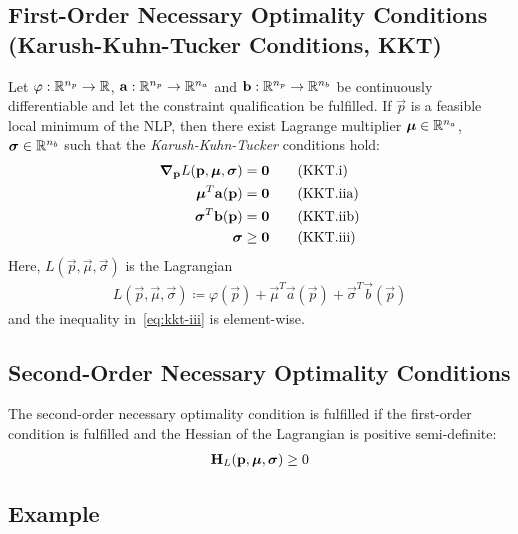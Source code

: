 		\subsection{First-Order Necessary Optimality Conditions (Karush-Kuhn-Tucker Conditions, KKT)}
			Let \( \varphi : \mathbb{R}^{n_p} \to \mathbb{R} \), \( \boldsymbol{\mathrm{a}} : \mathbb{R}^{n_p} \to \mathbb{R}^{n_a} \) and \( \boldsymbol{\mathrm{b}} : \mathbb{R}^{n_p} \to \mathbb{R}^{n_b} \) be continuously differentiable and let the constraint qualification be fulfilled. If \( \vec{p} \) is a feasible local minimum of the NLP, then there exist Lagrange multiplier \( \boldsymbol{\mathrm{\mu}} \in \mathbb{R}^{n_a} \), \( \boldsymbol{\mathrm{\sigma}} \in \mathbb{R}^{n_b} \) such that the \emph{Karush-Kuhn-Tucker} conditions hold:
			\begin{align}
				\grad_{\boldsymbol{\mathrm{p}}}L(\boldsymbol{\mathrm{p}}, \boldsymbol{\mathrm{\mu}}, \boldsymbol{\mathrm{\sigma}}) & = \boldsymbol{\mathrm{0}}    \tag{KKT.i}   \\
				\boldsymbol{\mathrm{\mu}}^T \boldsymbol{\mathrm{a}}(\boldsymbol{\mathrm{p}})                       & = \boldsymbol{\mathrm{0}}    \tag{KKT.iia} \\
				\boldsymbol{\mathrm{\sigma}}^T \boldsymbol{\mathrm{b}}(\boldsymbol{\mathrm{p}})                    & = \boldsymbol{\mathrm{0}}    \tag{KKT.iib} \\
				\boldsymbol{\mathrm{\sigma}}                                       & \geq \boldsymbol{\mathrm{0}} \tag{KKT.iii} \label{eq:kkt-iii}
			\end{align}
			Here, \( L(\vec{p}, \vec{\mu}, \vec{\sigma}) \) is the Lagrangian
			\begin{align*}
				L(\vec{p}, \vec{\mu}, \vec{\sigma}) \coloneqq \varphi(\vec{p}) + \vec{\mu}^T \vec{a}(\vec{p}) + \vec{\sigma}^T \vec{b}(\vec{p})
			\end{align*}
			and the inequality in~\eqref{eq:kkt-iii} is element-wise.

		\subsection{Second-Order Necessary Optimality Conditions}
			The second-order necessary optimality condition is fulfilled if the first-order condition is fulfilled and the Hessian of the Lagrangian is positive semi-definite:
			\begin{align*}
				\boldsymbol{\mathrm{H}}_L(\boldsymbol{\mathrm{p}}, \boldsymbol{\mathrm{\mu}}, \boldsymbol{\mathrm{\sigma}}) \geq 0
			\end{align*}

		\subsection{Example} %

